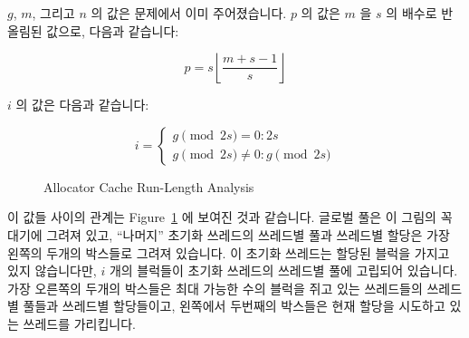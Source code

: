 \begin{enumerate}
	$g$, $m$, 그리고 $n$ 의 값은 문제에서 이미 주어졌습니다.
	$p$ 의 값은 $m$ 을 $s$ 의 배수로 반올림된 값으로, 다음과 같습니다:

	\begin{equation}
		p = s \left \lfloor \frac{m + s - 1}{s} \right \rfloor
	\label{sec:SMPdesign:p}
	\end{equation}

	$i$ 의 값은 다음과 같습니다:

	\begin{equation}
		i = \left \{
			\begin{array}{l}
				g \pmod{2 s} = 0: 2 s \\
				g \pmod{2 s} \ne 0: g \pmod{2 s}
			\end{array}
		    \right .
	\label{sec:SMPdesign:i}
	\end{equation}

	\begin{figure}[tb]
	\begin{center}
	\end{center}
	\caption{Allocator Cache Run-Length Analysis}
	\label{fig:SMPdesign:Allocator Cache Run-Length Analysis}
	\end{figure}

	이 값들 사이의 관계는
	Figure~\ref{fig:SMPdesign:Allocator Cache Run-Length Analysis} 에
	보여진 것과 같습니다.
	글로벌 풀은 이 그림의 꼭대기에 그려져 있고, ``나머지'' 초기화 쓰레드의
	쓰레드별 풀과 쓰레드별 할당은 가장 왼쪽의 두개의 박스들로 그려져
	있습니다.
	이 초기화 쓰레드는 할당된 블럭을 가지고 있지 않습니다만, $i$ 개의
	블럭들이 초기화 쓰레드의 쓰레드별 풀에 고립되어 있습니다.
	가장 오른쪽의 두개의 박스들은 최대 가능한 수의 블럭을 쥐고 있는
	쓰레드들의 쓰레드별 풀들과 쓰레드별 할당들이고, 왼쪽에서 두번째의
	박스들은 현재 할당을 시도하고 있는 쓰레드를 가리킵니다.


\end{enumerate}
